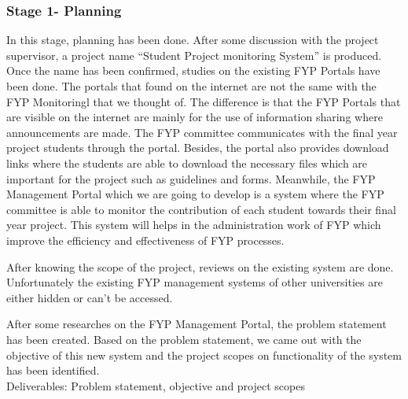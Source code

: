 \documentclass{article}
\begin{document}
\subsubsection{Stage 1- Planning}
\par In this stage, planning has been done. After some discussion with the project supervisor,
a project name “Student Project monitoring System” is produced. Once the name has been confirmed,
studies on the existing FYP Portals have been done. The portals that found on the internet are not
the same with the FYP Monitoringl that we thought of. The difference is that the FYP
Portals that are visible on the internet are mainly for the use of information sharing where
announcements are made. The FYP committee communicates with the final year project students
through the portal. Besides, the portal also provides download links where the students are able
to download the necessary files which are important for the project such as guidelines and forms.
Meanwhile, the FYP Management Portal which we are going to develop is a system where
the FYP committee is able to monitor the contribution of each student towards their final year project. This
system will helps in the administration work of FYP which improve the efficiency and
effectiveness of FYP processes.
\par After knowing the scope of the project, reviews on the existing system are done.
Unfortunately the existing FYP management systems of other universities are either hidden or
can’t be accessed. 
\par After some researches on the FYP Management Portal, the problem statement has been
created. Based on the problem statement, we came out with the objective of this new system and the project scopes
on functionality of the system has been identified.\\
Deliverables: Problem statement, objective and project scopes
\end{document}
